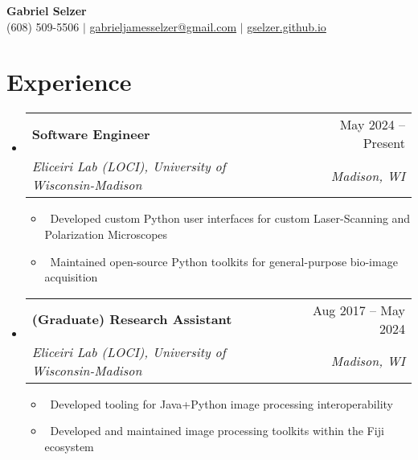 \documentclass[letterpaper,10pt]{article}
\makeatletter
\newcommand{\resumeItem}[1]{\item\small{#1}}
\newcommand{\resumeSubheading}[4]{
\vspace{-1pt}\item
  \begin{tabular*}{0.97\textwidth}[t]{l@{\extracolsep{\fill}}r}
    \textbf{#1} & #2 \\
    \textit{#3} & \textit{#4} \\
  \end{tabular*}\vspace{-7pt}
}
\newcommand{\resumeSubHeadingList}{\begin{itemize}[leftmargin=0.15in, label={}]}
\newcommand{\resumeSubHeadingListEnd}{\end{itemize}}
\makeatother
\begin{document}
\begin{center}
  \textbf{\Huge Gabriel Selzer} \\
  \small (608) 509-5506 $|$ \href{mailto:gabrieljamesselzer@gmail.com}{gabrieljamesselzer@gmail.com} $|$ 
  \href{https://gselzer.github.io}{gselzer.github.io}
\end{center}



\section{Experience}
\resumeSubHeadingList
  \resumeSubheading
      {Software Engineer}{May 2024 -- Present}
      {Eliceiri Lab (LOCI), University of Wisconsin-Madison}{Madison, WI}
      \resumeSubHeadingList
          \resumeItem{\textbullet\ Developed custom Python user interfaces for custom Laser-Scanning and Polarization Microscopes}
          \resumeItem{\textbullet\ Maintained open-source Python toolkits for general-purpose bio-image acquisition}
      \resumeSubHeadingListEnd
  \resumeSubheading
      {(Graduate) Research Assistant}{Aug 2017 -- May 2024}
      {Eliceiri Lab (LOCI), University of Wisconsin-Madison}{Madison, WI}
      \resumeSubHeadingList
          \resumeItem{\textbullet\ Developed tooling for Java+Python image processing interoperability}
          \resumeItem{\textbullet\ Developed and maintained image processing toolkits within the Fiji ecosystem}
      \resumeSubHeadingListEnd
\resumeSubHeadingListEnd
\end{document}
